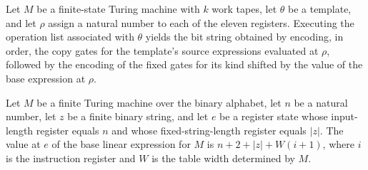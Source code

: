 \begin{theorem}
\label{Complexity.UTab.instrOps_exec}
\leanok
{}
Let $M$ be a finite-state Turing machine with $k$ work tapes, let $\theta$ be a
template, and let $\rho$ assign a natural number to each of the eleven registers.
Executing the operation list associated with $\theta$ yields the bit string obtained by
encoding, in order, the copy gates for the template’s source expressions evaluated at
$\rho$, followed by the encoding of the fixed gates for its kind shifted by the value of
the base expression at $\rho$.
\end{theorem}

\begin{theorem}
\label{Complexity.UTab.baseE_val}
\leanok
{}
Let $M$ be a finite Turing machine over the binary alphabet, let $n$ be a natural
number, let $z$ be a finite binary string, and let $e$ be a register state whose
input-length register equals $n$ and whose fixed-string-length register equals $|z|$.
The value at $e$ of the base linear expression for $M$ is $n+2+|z|+W(i+1)$, where $i$ is
the instruction register and $W$ is the table width determined by $M$.
\end{theorem}

